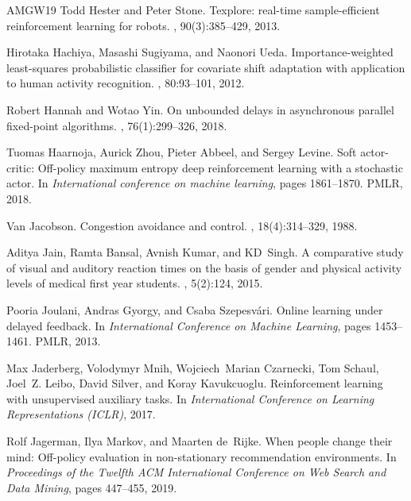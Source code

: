 \begin{thebibliography}{AMGW{\etalchar{+}}19}
Todd Hester and Peter Stone.
\newblock Texplore: real-time sample-efficient reinforcement learning for robots.
, 90(3):385--429, 2013.

Hirotaka Hachiya, Masashi Sugiyama, and Naonori Ueda.
\newblock Importance-weighted least-squares probabilistic classifier for covariate shift adaptation with application to human activity recognition.
, 80:93--101, 2012.

Robert Hannah and Wotao Yin.
\newblock On unbounded delays in asynchronous parallel fixed-point algorithms.
, 76(1):299--326, 2018.

Tuomas Haarnoja, Aurick Zhou, Pieter Abbeel, and Sergey Levine.
\newblock Soft actor-critic: Off-policy maximum entropy deep reinforcement learning with a stochastic actor.
\newblock In {\em International conference on machine learning}, pages 1861--1870. PMLR, 2018.

Van Jacobson.
\newblock Congestion avoidance and control.
, 18(4):314--329, 1988.

Aditya Jain, Ramta Bansal, Avnish Kumar, and KD~Singh.
\newblock A comparative study of visual and auditory reaction times on the basis of gender and physical activity levels of medical first year students.
, 5(2):124, 2015.

Pooria Joulani, Andras Gyorgy, and Csaba Szepesv{\'a}ri.
\newblock Online learning under delayed feedback.
\newblock In {\em International Conference on Machine Learning}, pages 1453--1461. PMLR, 2013.

Max Jaderberg, Volodymyr Mnih, Wojciech~Marian Czarnecki, Tom Schaul, Joel~Z. Leibo, David Silver, and Koray Kavukcuoglu.
\newblock Reinforcement learning with unsupervised auxiliary tasks.
\newblock In {\em International Conference on Learning Representations (ICLR)}, 2017.

Rolf Jagerman, Ilya Markov, and Maarten de~Rijke.
\newblock When people change their mind: Off-policy evaluation in non-stationary recommendation environments.
\newblock In {\em Proceedings of the Twelfth ACM International Conference on Web Search and Data Mining}, pages 447--455, 2019.


\end{thebibliography}
